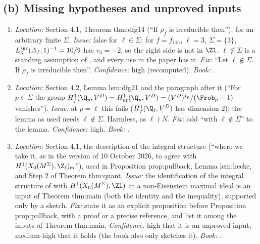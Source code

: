 \begin{sloppypar}
\subsection*{(b) Missing hypotheses and unproved inputs}
\begin{enumerate}[label=\textbf{E\arabic*},ref=E\arabic*,series=errata]
\item\label{err:paper:dfg14} \emph{Location:} Section 4.1, Theorem thm:dfg14 (``If $\bar\rho_f$ is irreducible then''), for an arbitrary finite $\Sigma$. \emph{Issue:} false for $\ell\in\Sigma$: for $f=f_{11a}$, $\ell=3$,
$\Sigma=\{3\}$, $L^{\nv}_3(A_f,1)^{-1}=10/9$ has $v_3=-2$, so the right side is not in $\Zl$. $\ell\notin\Sigma$ is a standing assumption of \cite[Section 1.7.3]{DFG04}, and every use in the paper has it.
\emph{Fix:} ``Let $\ell\notin\Sigma$. If $\bar\rho_f$ is irreducible then''. \emph{Confidence:} high (recomputed). \emph{Book:} .
\item\label{err:paper:dfg21} \emph{Location:} Section 4.2, Lemma lem:dfg21 and the paragraph after it (``For $p\in\Sigma$ the group $H^1_f(\Q_p,V^D)=H^1_{\mathrm{ur}}(\Q_p,V^D)=(V^D)^{I_p}/(\Frob_p-1)$
vanishes''). \emph{Issue:} at $p=\ell$ this fails ($H^1_f(\Q_\ell,V^D)$ has dimension $2$); the lemma as used needs $\ell\notin\Sigma$. Harmless, as $\ell\nmid N$. \emph{Fix:} add ``with $\ell\notin\Sigma$'' to the
lemma. \emph{Confidence:} high. \emph{Book:} .
\item\label{err:paper:integral-structure} \emph{Location:} Section 4.1, the description of the integral structure (``where we take it, as in the version of 10 October 2026, to agree with
$H^1(X_0(M^\Sigma),\Z_\ell)_{\mathfrak m}$''), used in Proposition prop:pullback, Lemma lem:hecke, and Step 2 of Theorem thm:quant. \emph{Issue:} the identification of the integral structure of
\cite{DFG04} with $H^1(X_0(M^\Sigma),\Zl)$ at a non-Eisenstein maximal ideal is an input of Theorem thm:main (both the identity and the inequality), supported only by a sketch. \emph{Fix:}
state it as an explicit proposition before Proposition prop:pullback, with a proof or a precise reference, and list it among the inputs of Theorem thm:main. \emph{Confidence:} high that it is
an unproved input; medium-high that it holds (the book also only sketches it). \emph{Book:} .
\end{enumerate}


\end{sloppypar}
